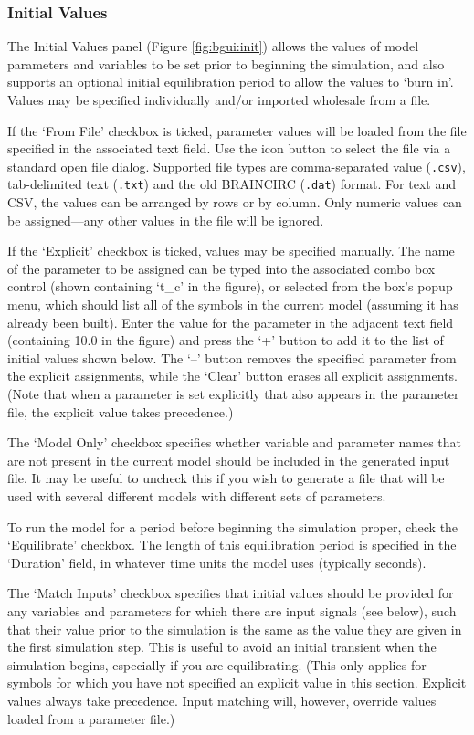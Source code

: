 \documentclass[a4paper,11pt]{article}
\begin{document}
\subsubsection{Initial Values}\label{bgui:init}

The Initial Values panel  (Figure \ref{fig:bgui:init}) allows the values of model parameters and variables to be set prior to beginning the simulation, and also supports an optional initial equilibration period to allow the values to `burn in'. Values may be specified individually and/or imported wholesale from a file.

If the `From File' checkbox is ticked, parameter values will be loaded from the file specified in the associated text field. Use the icon button to select the file via a standard open file dialog. Supported file types are comma-separated value (\texttt{.csv}), tab-delimited text (\texttt{.txt}) and the old BRAINCIRC (\texttt{.dat}) format. For text and CSV, the values can be arranged by rows or by column. Only numeric values can be assigned---any other values in the file will be ignored.

If the `Explicit' checkbox is ticked, values may be specified manually. The name of the parameter to be assigned can be typed into the associated combo box control (shown containing `t\_c' in the figure), or selected from the box's popup menu, which should list all of the symbols in the current model (assuming it has already been built). Enter the value for the parameter in the adjacent text field (containing 10.0 in the figure) and press the `+' button to add it to the list of initial values shown below. The `--' button removes the specified parameter from the explicit assignments, while the `Clear' button erases all explicit assignments. (Note that when a parameter is set explicitly that also appears in the parameter file, the explicit value takes precedence.)

The `Model Only' checkbox specifies whether variable and parameter names that are not present in the current model should be included in the generated input file. It may be useful to uncheck this if you wish to generate a file that will be used with several different models with different sets of parameters.

To run the model for a period before beginning the simulation proper, check the `Equilibrate' checkbox. The length of this equilibration period is specified in the `Duration' field, in whatever time units the model uses (typically seconds).

The `Match Inputs' checkbox specifies that initial values should be provided for any variables and parameters for which there are input signals (see below), such that their value prior to the simulation is the same as the value they are given in the first simulation step. This is useful to avoid an initial transient when the simulation begins, especially if you are equilibrating. (This only applies for symbols for which you have not specified an explicit value in this section. Explicit values always take precedence. Input matching will, however, override values loaded from a parameter file.)
\end{document}
